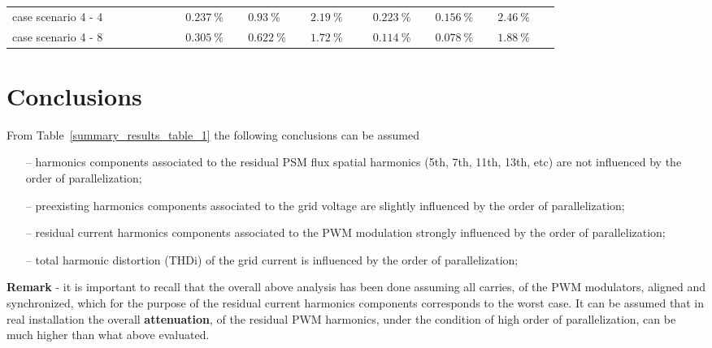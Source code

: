 \documentclass[12pt,a4paper]{scrartcl}
\begin{document}
\begin{onehalfspace}
\begin{center}
\begin{longtable}{p{0.25\linewidth}|p{0.09\linewidth}|p{0.09\linewidth}|p{0.09\linewidth}|p{0.09\linewidth}|p{0.09\linewidth}|p{0.09\linewidth}}
		case scenario 4 - 4 & \hspace*{\fill} $\SI{0.237}{\percent}$ & \hspace*{\fill} $\SI{0.93}{\percent}$ & \hspace*{\fill} $\SI{2.19}{\percent}$ & \hspace*{\fill} $\SI{0.223}{\percent}$ & \hspace*{\fill} $\SI{0.156}{\percent}$ & \hspace*{\fill} $\SI{2.46}{\percent}$\\		
		case scenario 4 - 8 & \hspace*{\fill} $\SI{0.305}{\percent}$ & \hspace*{\fill} $\SI{0.622}{\percent}$ & \hspace*{\fill} $\SI{1.72}{\percent}$ & \hspace*{\fill} $\SI{0.114}{\percent}$ & \hspace*{\fill} $\SI{0.078}{\percent}$ & \hspace*{\fill} $\SI{1.88}{\percent}$\\	
		\hline
	\end{longtable}
\end{center}


\section{Conclusions}
From Table~\ref{summary_results_table_1} the following conclusions can be assumed
\begin{itemize}
	\item[--] harmonics components associated to the residual PSM flux spatial harmonics (5th, 7th, 11th, 13th, etc) are not influenced by the order of parallelization; 
	\item[--] preexisting harmonics components associated to the grid voltage are slightly influenced by the order of parallelization; 
	\item[--] residual current harmonics components associated to the PWM modulation strongly influenced by the order of parallelization; 
	\item[--] total harmonic distortion (THDi) of the grid current is influenced by the order of parallelization; 
\end{itemize}

\noindent\textbf{Remark} - it is important to recall that the overall above analysis has been done assuming all carries, of the  PWM modulators, aligned and synchronized, which for the purpose of the residual current harmonics components corresponds to the worst case. It can be assumed that in real installation the overall \textbf{attenuation}, of the residual PWM harmonics, under the condition of high order of parallelization, can be much higher than what above evaluated. 


\end{onehalfspace}
\end{document}
